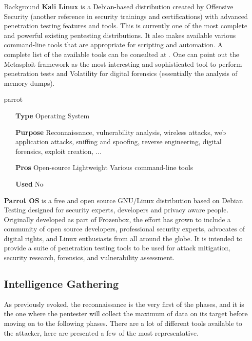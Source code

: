 \begin{chaptercover}{Background}
{
\textbf{Kali Linux} \cite{kali-linux} is a Debian-based distribution created by Offensive Security \cite{offensive-security} (another reference in security trainings and certifications) with advanced penetration testing features and tools. This is currently one of the most complete and powerful existing pentesting distributions. It also makes available various command-line tools that are appropriate for scripting and automation. A complete list of the available tools can be consulted at \cite{kali-linux-tools}. One can point out the Metasploit framework \cite{metasploit} as the most interesting and sophisticated tool to perform penetration tests and Volatility \cite{volatility} for digital forensics (essentially the analysis of memory dumps).}

\begin{solutiondata}{parrot}
\begin{itemize}[labelsep=1cm]
  \item [\textbf{Type}] Operating System
  \item [\textbf{Purpose}] Reconnaissance, vulnerability analysis, wireless attacks, web application attacks, sniffing and spoofing, reverse engineering, digital forensics, exploit creation, ...
  \item [\textbf{Pros}] Open-source \newline Lightweight \newline Various command-line tools
  \item [\textbf{Used}] No
\end{itemize}
\end{solutiondata}

\textbf{Parrot OS} \cite{parrot-os} is a free and open source GNU/Linux distribution based on Debian Testing designed for security experts, developers and privacy aware people. Originally developed as part of Frozenbox, the effort has grown to include a community of open source developers, professional security experts, advocates of digital rights, and Linux enthusiasts from all around the globe. It is intended to provide a suite of penetration testing tools to be used for attack mitigation, security research, forensics, and vulnerability assessment.

\subsection{Intelligence Gathering}

As previously evoked, the reconnaissance is the very first of the phases, and it is the one where the pentester will collect the maximum of data on its target before moving on to the following phases. There are a lot of different tools available to the attacker, here are presented a few of the most representative.


\end{chaptercover}
